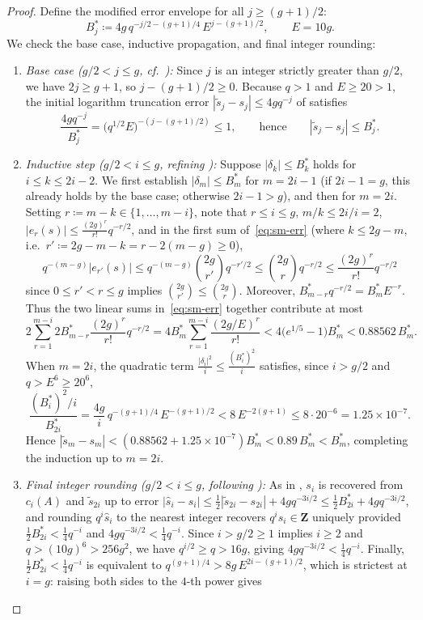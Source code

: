 \documentclass[11pt]{amsart}
\theoremstyle{remark}
\newcommand{\Z}{\mathbf{Z}}
\begin{document}
\begin{proof}
Define the modified error envelope for all $j \ge (g + 1)/2$:
\[
B_j^* \coloneqq 4g\, q^{-j/2 - (g+1)/4}\, E^{j - (g+1)/2}, \qquad E = 10g.
\]
We check the base case, inductive propagation, and final integer rounding:
\begin{enumerate}
\item \emph{Base case ($g/2 < j \le g$, cf.\ \cite[Lemma~5.3]{CK26}):} Since $j$ is an integer strictly greater than $g/2$, we have $2j \ge g + 1$, so $j - (g + 1)/2 \ge 0$. Because $q > 1$ and $E \ge 20 > 1$, the initial logarithm truncation error $|\tilde{s}_j - s_j| \le 4g q^{-j}$ of \cite[Lemma~5.3]{CK26} satisfies
\[
\frac{4g q^{-j}}{B_j^*} = \bigl(q^{1/2} E\bigr)^{-(j - (g+1)/2)} \le 1, \qquad \text{hence} \qquad |\tilde{s}_j - s_j| \le B_j^*.
\]
\item \emph{Inductive step ($g/2 < i \le g$, refining \cite[Lemma~5.2]{CK26}):} Suppose $|\delta_k| \le B_k^*$ holds for $i \le k \le 2i - 2$. We first establish $|\delta_m| \le B_m^*$ for $m = 2i - 1$ (if $2i - 1 = g$, this already holds by the base case; otherwise $2i - 1 > g$), and then for $m = 2i$. Setting $r \coloneqq m - k \in \{1, \dots, m - i\}$, note that $r \le i \le g$, $m/k \le 2i/i = 2$, $|e_r(s)| \le \frac{(2g)^r}{r!} q^{-r/2}$, and in the first sum of~\eqref{eq:sm-err} (where $k \le 2g - m$, i.e.\ $r' \coloneqq 2g - m - k = r - 2(m - g) \ge 0$),
\[
q^{-(m-g)} |e_{r'}(s)| \le q^{-(m-g)} \binom{2g}{r'} q^{-r'/2} \le \binom{2g}{r} q^{-r/2} \le \frac{(2g)^r}{r!} q^{-r/2}
\]
since $0 \le r' < r \le g$ implies $\binom{2g}{r'} \le \binom{2g}{r}$. Moreover, $B_{m-r}^* q^{-r/2} = B_m^* E^{-r}$. Thus the two linear sums in~\eqref{eq:sm-err} together contribute at most
\[
2 \sum_{r=1}^{m-i} 2 B_{m-r}^* \frac{(2g)^r}{r!} q^{-r/2} = 4 B_m^* \sum_{r=1}^{m-i} \frac{(2g/E)^r}{r!} < 4\bigl(e^{1/5} - 1\bigr) B_m^* < 0.88562\, B_m^*.
\]
When $m = 2i$, the quadratic term $\frac{|\delta_i|^2}{i} \le \frac{(B_i^*)^2}{i}$ satisfies, since $i > g/2$ and $q > E^6 \ge 20^6$,
\[
\frac{(B_i^*)^2 / i}{B_{2i}^*} = \frac{4g}{i}\, q^{-(g+1)/4}\, E^{-(g+1)/2} < 8\, E^{-2(g+1)} \le 8 \cdot 20^{-6} = 1.25 \times 10^{-7}.
\]
Hence $|\tilde{s}_m - s_m| < (0.88562 + 1.25 \times 10^{-7}) B_m^* < 0.89\, B_m^* < B_m^*$, completing the induction up to $m = 2i$.
\item \emph{Final integer rounding ($g/2 < i \le g$, following \cite[Section~6]{CK26}):} As in \cite[Section~6]{CK26}, $s_i$ is recovered from $c_i(A)$ and $\tilde{s}_{2i}$ up to error $|\hat{s}_i - s_i| \le \frac{1}{2}|\tilde{s}_{2i} - s_{2i}| + 4g q^{-3i/2} \le \frac{1}{2} B_{2i}^* + 4g q^{-3i/2}$, and rounding $q^i \hat{s}_i$ to the nearest integer recovers $q^i s_i \in \Z$ uniquely provided $\frac{1}{2} B_{2i}^* < \frac{1}{4} q^{-i}$ and $4g q^{-3i/2} < \frac{1}{4} q^{-i}$. Since $i > g/2 \ge 1$ implies $i \ge 2$ and $q > (10g)^6 > 256 g^2$, we have $q^{i/2} \ge q > 16g$, giving $4g q^{-3i/2} < \frac{1}{4} q^{-i}$. Finally, $\frac{1}{2} B_{2i}^* < \frac{1}{4} q^{-i}$ is equivalent to $q^{(g+1)/4} > 8g\, E^{2i - (g+1)/2}$, which is strictest at $i = g$: raising both sides to the $4$-th power gives

\end{enumerate}
\end{proof}
\end{document}
